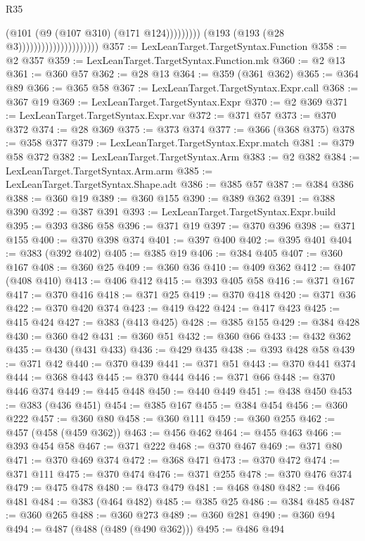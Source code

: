 \begin{lexlean}{R35}
\begin{coremodule}
{{{{{{{{{{{{{{{{{{{{{{{{{{{{{{{{{{{{{{{{{{{{{{{{{{{{                                                    (@101 (@9 (@107 @310) (@171 @124)))))))))
                                        (@193 (@193 (@28 @3)))))))))))))))))))))
@357 := LexLeanTarget.TargetSyntax.Function
@358 := @2 @357
@359 := LexLeanTarget.TargetSyntax.Function.mk
@360 := @2 @13
@361 := @360 @57
@362 := @28 @13
@364 := @359 (@361 @362)
@365 := @364 @89
@366 := @365 @58
@367 := LexLeanTarget.TargetSyntax.Expr.call
@368 := @367 @19
@369 := LexLeanTarget.TargetSyntax.Expr
@370 := @2 @369
@371 := LexLeanTarget.TargetSyntax.Expr.var
@372 := @371 @57
@373 := @370 @372
@374 := @28 @369
@375 := @373 @374
@377 := @366 (@368 @375)
@378 := @358 @377
@379 := LexLeanTarget.TargetSyntax.Expr.match
@381 := @379 @58 @372
@382 := LexLeanTarget.TargetSyntax.Arm
@383 := @2 @382
@384 := LexLeanTarget.TargetSyntax.Arm.arm
@385 := LexLeanTarget.TargetSyntax.Shape.adt
@386 := @385 @57
@387 := @384 @386
@388 := @360 @19
@389 := @360 @155
@390 := @389 @362
@391 := @388 @390
@392 := @387 @391
@393 := LexLeanTarget.TargetSyntax.Expr.build
@395 := @393 @386 @58
@396 := @371 @19
@397 := @370 @396
@398 := @371 @155
@400 := @370 @398 @374
@401 := @397 @400
@402 := @395 @401
@404 := @383 (@392 @402)
@405 := @385 @19
@406 := @384 @405
@407 := @360 @167
@408 := @360 @25
@409 := @360 @36
@410 := @409 @362
@412 := @407 (@408 @410)
@413 := @406 @412
@415 := @393 @405 @58
@416 := @371 @167
@417 := @370 @416
@418 := @371 @25
@419 := @370 @418
@420 := @371 @36
@422 := @370 @420 @374
@423 := @419 @422
@424 := @417 @423
@425 := @415 @424
@427 := @383 (@413 @425)
@428 := @385 @155
@429 := @384 @428
@430 := @360 @42
@431 := @360 @51
@432 := @360 @66
@433 := @432 @362
@435 := @430 (@431 @433)
@436 := @429 @435
@438 := @393 @428 @58
@439 := @371 @42
@440 := @370 @439
@441 := @371 @51
@443 := @370 @441 @374
@444 := @368 @443
@445 := @370 @444
@446 := @371 @66
@448 := @370 @446 @374
@449 := @445 @448
@450 := @440 @449
@451 := @438 @450
@453 := @383 (@436 @451)
@454 := @385 @167
@455 := @384 @454
@456 := @360 @222
@457 := @360 @80
@458 := @360 @111
@459 := @360 @255
@462 := @457 (@458 (@459 @362))
@463 := @456 @462
@464 := @455 @463
@466 := @393 @454 @58
@467 := @371 @222
@468 := @370 @467
@469 := @371 @80
@471 := @370 @469 @374
@472 := @368 @471
@473 := @370 @472
@474 := @371 @111
@475 := @370 @474
@476 := @371 @255
@478 := @370 @476 @374
@479 := @475 @478
@480 := @473 @479
@481 := @468 @480
@482 := @466 @481
@484 := @383 (@464 @482)
@485 := @385 @25
@486 := @384 @485
@487 := @360 @265
@488 := @360 @273
@489 := @360 @281
@490 := @360 @94
@494 := @487 (@488 (@489 (@490 @362)))
@495 := @486 @494
}}}}}}}}}}}}}}}}}}}}}}}}}}}}}}}}}}}}}}}}}}}}}}}}}}}}
\end{coremodule}
\end{lexlean}
